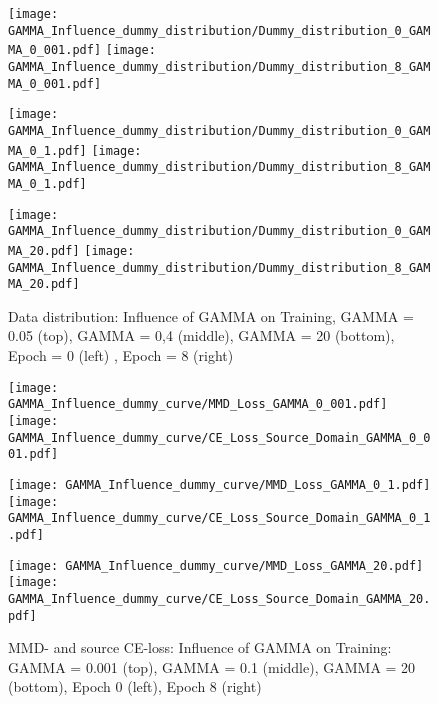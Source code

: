 \begin{figure}[H]
  \centering
  \texttt{[image: GAMMA\_Influence\_dummy\_distribution/Dummy\_distribution\_0\_GAMMA\_0\_001.pdf]}
  \hspace{.4cm}
  \texttt{[image: GAMMA\_Influence\_dummy\_distribution/Dummy\_distribution\_8\_GAMMA\_0\_001.pdf]}

  \vspace{.1cm}

  \texttt{[image: GAMMA\_Influence\_dummy\_distribution/Dummy\_distribution\_0\_GAMMA\_0\_1.pdf]}
  \hspace{.4cm}
  \texttt{[image: GAMMA\_Influence\_dummy\_distribution/Dummy\_distribution\_8\_GAMMA\_0\_1.pdf]}

  \vspace{.1cm}

  \texttt{[image: GAMMA\_Influence\_dummy\_distribution/Dummy\_distribution\_0\_GAMMA\_20.pdf]}
  \hspace{.4cm}
  \texttt{[image: GAMMA\_Influence\_dummy\_distribution/Dummy\_distribution\_8\_GAMMA\_20.pdf]}
 

  \caption{Data distribution: Influence of GAMMA on Training, GAMMA = 0.05 (top), GAMMA = 0,4 (middle), GAMMA = 20 (bottom), Epoch = 0 (left) , Epoch = 8 (right)}
  \label{fig:point_cloud_mmd}
\end{figure}


\begin{figure}[H]
  \centering
  \texttt{[image: GAMMA\_Influence\_dummy\_curve/MMD\_Loss\_GAMMA\_0\_001.pdf]}
  \hspace{.3cm}
  \texttt{[image: GAMMA\_Influence\_dummy\_curve/CE\_Loss\_Source\_Domain\_GAMMA\_0\_001.pdf]}

  \vspace{.1cm}

  \texttt{[image: GAMMA\_Influence\_dummy\_curve/MMD\_Loss\_GAMMA\_0\_1.pdf]}
  \hspace{.3cm}
  \texttt{[image: GAMMA\_Influence\_dummy\_curve/CE\_Loss\_Source\_Domain\_GAMMA\_0\_1.pdf]}

  \vspace{.1cm}

  \texttt{[image: GAMMA\_Influence\_dummy\_curve/MMD\_Loss\_GAMMA\_20.pdf]}
  \hspace{.1cm}
  \texttt{[image: GAMMA\_Influence\_dummy\_curve/CE\_Loss\_Source\_Domain\_GAMMA\_20.pdf]}

  \caption{MMD- and source CE-loss: Influence of GAMMA on Training: GAMMA = 0.001 (top), GAMMA = 0.1 (middle), GAMMA = 20 (bottom), Epoch 0 (left), Epoch 8 (right)}
  \label{fig:learning_curves_influence_mmd_feature_extractor}
\end{figure}

